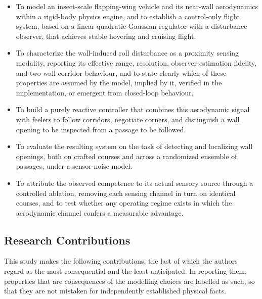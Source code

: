 \documentclass[final,5p,times]{elsarticle}
\begin{document}
\begin{itemize}
    \item To model an insect-scale flapping-wing vehicle and its near-wall aerodynamics within a rigid-body physics engine, and to establish a control-only flight system, based on a linear-quadratic-Gaussian regulator with a disturbance observer, that achieves stable hovering and cruising flight.
    \item To characterize the wall-induced roll disturbance as a proximity sensing modality, reporting its effective range, resolution, observer-estimation fidelity, and two-wall corridor behaviour, and to state clearly which of these properties are assumed by the model, implied by it, verified in the implementation, or emergent from closed-loop behaviour.
    \item To build a purely reactive controller that combines this aerodynamic signal with feelers to follow corridors, negotiate corners, and distinguish a wall opening to be inspected from a passage to be followed.
    \item To evaluate the resulting system on the task of detecting and localizing wall openings, both on crafted courses and across a randomized ensemble of passages, under a sensor-noise model.
    \item To attribute the observed competence to its actual sensory source through a controlled ablation, removing each sensing channel in turn on identical courses, and to test whether any operating regime exists in which the aerodynamic channel confers a measurable advantage.
\end{itemize}

\subsection{Research Contributions}
\label{sec:contributions}

This study makes the following contributions, the last of which the authors regard as the most consequential and the least anticipated. In reporting them, properties that are consequences of the modelling choices are labelled as such, so that they are not mistaken for independently established physical facts.
\end{document}
